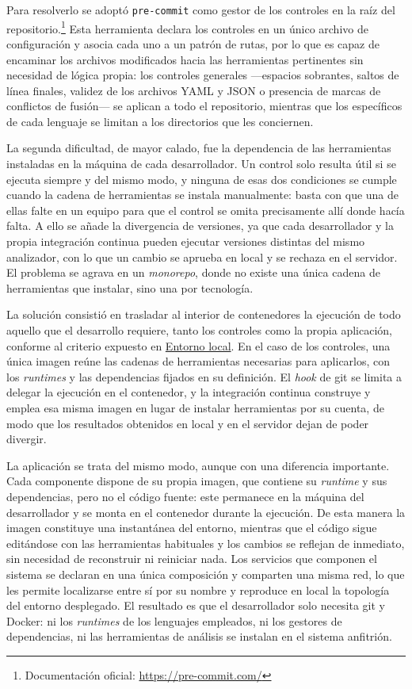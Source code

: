 Para resolverlo se adoptó \texttt{pre-commit} como gestor de los controles en la
raíz del repositorio.\footnote{Documentación oficial: \url{https://pre-commit.com/}}
Esta herramienta declara los controles en un único archivo de configuración y
asocia cada uno a un patrón de rutas, por lo que es capaz de encaminar los
archivos modificados hacia las herramientas pertinentes sin necesidad de lógica
propia: los controles generales —espacios sobrantes, saltos de línea finales,
validez de los archivos YAML y JSON o presencia de marcas de conflictos de
fusión— se aplican a todo el repositorio, mientras que los específicos de cada
lenguaje se limitan a los directorios que les conciernen.

La segunda dificultad, de mayor calado, fue la dependencia de las herramientas
instaladas en la máquina de cada desarrollador. Un control solo resulta útil si
se ejecuta siempre y del mismo modo, y ninguna de esas dos condiciones se
cumple cuando la cadena de herramientas se instala manualmente: basta con que
una de ellas falte en un equipo para que el control se omita precisamente allí
donde hacía falta. A ello se añade la divergencia de versiones, ya que cada
desarrollador y la propia integración continua pueden ejecutar versiones
distintas del mismo analizador, con lo que un cambio se aprueba en local y se
rechaza en el servidor. El problema se agrava en un \textit{monorepo}, donde no
existe una única cadena de herramientas que instalar, sino una por tecnología.

La solución consistió en trasladar al interior de contenedores la ejecución de
todo aquello que el desarrollo requiere, tanto los controles como la propia
aplicación, conforme al criterio expuesto en
\hyperref[sec:entorno-local]{Entorno local}. En el caso de los controles, una
única imagen reúne las cadenas de herramientas necesarias para aplicarlos, con
los \textit{runtimes} y las dependencias fijados en su definición. El
\textit{hook} de git se limita a delegar la ejecución en el contenedor, y la
integración continua construye y emplea esa misma imagen en lugar de instalar
herramientas por su cuenta, de modo que los resultados obtenidos en local y en
el servidor dejan de poder divergir.

La aplicación se trata del mismo modo, aunque con una diferencia importante.
Cada componente dispone de su propia imagen, que contiene su \textit{runtime} y
sus dependencias, pero no el código fuente: este permanece en la máquina del
desarrollador y se monta en el contenedor durante la ejecución. De esta manera
la imagen constituye una instantánea del entorno, mientras que el código sigue
editándose con las herramientas habituales y los cambios se reflejan de
inmediato, sin necesidad de reconstruir ni reiniciar nada. Los servicios que
componen el sistema se declaran en una única composición y comparten una misma
red, lo que les permite localizarse entre sí por su nombre y reproduce en local
la topología del entorno desplegado. El resultado es que el desarrollador solo
necesita git y Docker: ni los \textit{runtimes} de los
lenguajes empleados, ni los gestores de dependencias, ni las herramientas de
análisis se instalan en el sistema anfitrión.

